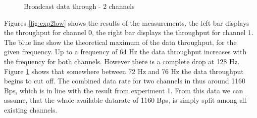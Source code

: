 \begin{description}
\begin{figure}[H]
		\caption{Broadcast data through - 2 channels}\label{fig:exp2high}
	\end{figure}
	Figures \ref{fig:exp2low} shows the results of the measurements, the left bar displays the throughput for channel 0, the right bar displays the throughput for channel 1. The blue line show the theoretical maximum of the data throughput, for the given frequency. Up to a frequency of 64 Hz the data throughput increases with the frequency for both channels. However there is a complete drop at 128 Hz. Figure \ref{fig:exp2high} shows that somewhere between 72 Hz and 76 Hz the data throughput begins to cut off. The combined data rate for two channels in thus around 1160 Bps, which is in line with the result from experiment 1. From this data we can assume, that the whole available datarate of 1160 Bps, is simply split among all existing channels.
\end{description}
\newpage


